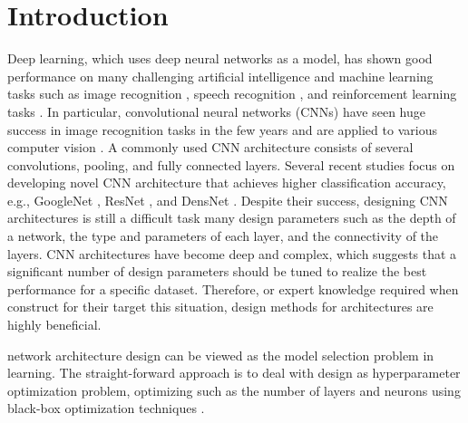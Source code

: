 \section{Introduction}

Deep learning, which uses deep neural networks as a model, has shown good performance on many challenging artificial intelligence and machine learning tasks\new{,} such as image recognition \cite{lecun_gradient-based_1998,krizhevsky_imagenet_2012}, speech recognition \cite{hinton_deep_2012}, and reinforcement learning tasks \cite{mnih_playing_2013,mnih_human-level_2015}.
In particular, convolutional neural networks (CNNs) \cite{lecun_gradient-based_1998} have seen huge success in image recognition tasks in the  few years and are applied to various computer vision  \cite{vinyals_show_2015,zhang_colorful_2016}.
A commonly used CNN architecture consists  of several convolutions, pooling, and fully connected layers.
Several recent studies focus on developing  novel CNN architecture that achieves higher classification accuracy, e.g., GoogleNet \cite{szegedy_going_2015}, ResNet \cite{he_deep_2016}, and DensNet \cite{huang_densely_2016}.
Despite their success, designing CNN architectures is still a difficult task  many design parameters  such as the depth of a network, the type and parameters of each layer, and the connectivity of the layers.
 CNN architectures have become deep and complex, which suggests that a significant number of design parameters should be tuned to realize the best performance for a specific dataset.
Therefore,  or expert knowledge  required when  construct   for their target 
 this situation,  design methods for  architectures are highly beneficial.

 network architecture design can be viewed as the model selection problem in  learning. The straight-forward approach is to deal with  design as  hyperparameter optimization problem, optimizing   such as the number of layers and neurons\new{,} using black-box optimization techniques \cite{loshchilov_cma-es_2016,snoek_practical_2012}.

